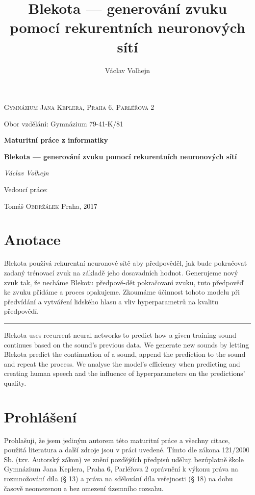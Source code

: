 \documentclass[a4]{article}
\begin{document}
\title{Blekota --- generování zvuku pomocí rekurentních neuronových sítí}
\author{Václav Volhejn}

\begin{titlepage}
\centering
{\scshape\Large Gymnázium Jana Keplera, Praha 6, Parléřova 2 \par}
{Obor vzdělání: Gymnázium 79-41-K/81 \par}
\vspace{1.5cm}
{\large\bfseries Maturitní práce z informatiky \par}
\vspace{0.5cm}
{\huge\bfseries Blekota --- generování zvuku pomocí rekurentních neuronových sítí \par}

\vspace{2cm}
{\Large\itshape Václav Volhejn \par}
\vfill
Vedoucí práce: \par
Tomáš \textsc{Obdržálek}
\vfill
{\large Praha, 2017} %
\end{titlepage}

\tableofcontents
\section{Anotace}

Blekota používá rekurentní neuronové sítě aby předpověděl, jak bude pokračovat zadaný trénovací zvuk na základě jeho dosavadních hodnot. Generujeme nový zvuk tak, že necháme Blekotu předpově-dět pokračovaní zvuku, tuto předpověď ke zvuku přidáme a proces opakujeme. Zkoumáme účinnost tohoto modelu při předvídání a vytváření lidského hlasu a vliv hyperparametrů na kvalitu předpovědí.

\noindent\rule[0.5ex]{\linewidth}{0.8pt}
Blekota uses recurrent neural networks to predict how a given training sound continues based on the sound's previous data. We generate new sounds by letting Blekota predict the continuation of a sound, append the prediction to the sound and repeat the process. We analyse the model's efficiency when predicting and creating human speech and the influence of hyperparameters on the predictions' quality.
\section{Prohlášení}
Prohlašuji, že jsem jediným autorem této maturitní práce a všechny citace, použitá literatura a další zdroje jsou v práci uvedené. Tímto dle zákona 121/2000 Sb. (tzv. Autorský zákon) ve znění pozdějších předpisů uděluji bezúplatně škole Gymnázium Jana Keplera, Praha 6, Parléřova 2 oprávnění k výkonu práva na rozmnožování díla (§ 13) a práva na sdělování díla veřejnosti (§ 18) na dobu časově neomezenou a bez omezení územního rozsahu.
\end{document}
